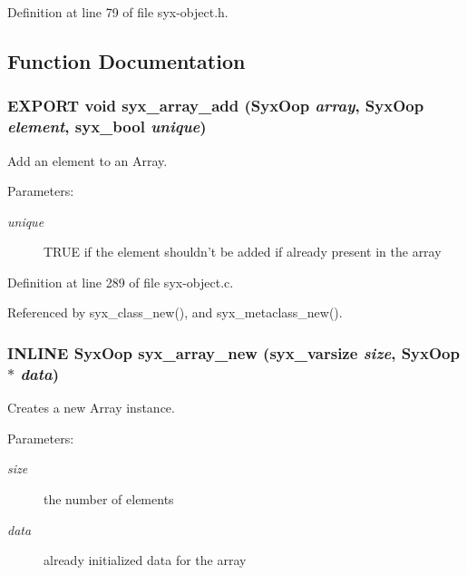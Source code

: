 Definition at line 79 of file syx-object.h.

\subsection{Function Documentation}
\hypertarget{syx-object_8h_b322ffdd7c235f42e9bd992a6013c680}{
\subsubsection{\setlength{\rightskip}{0pt plus 5cm}EXPORT void syx\_\-array\_\-add ({\bf SyxOop} {\em array}, \/  {\bf SyxOop} {\em element}, \/  {\bf syx\_\-bool} {\em unique})}}
\label{syx-object_8h_b322ffdd7c235f42e9bd992a6013c680}


Add an element to an Array.

\begin{Desc}
\item[Parameters:]
\begin{description}
\item[{\em unique}]TRUE if the element shouldn't be added if already present in the array \end{description}
\end{Desc}


Definition at line 289 of file syx-object.c.

Referenced by syx\_\-class\_\-new(), and syx\_\-metaclass\_\-new().\hypertarget{syx-object_8h_73d606c8733a400233809b9dbdffdfb1}{
\subsubsection{\setlength{\rightskip}{0pt plus 5cm}INLINE {\bf SyxOop} syx\_\-array\_\-new ({\bf syx\_\-varsize} {\em size}, \/  {\bf SyxOop} $\ast$ {\em data})}}
\label{syx-object_8h_73d606c8733a400233809b9dbdffdfb1}


Creates a new Array instance.

\begin{Desc}
\item[Parameters:]
\begin{description}
\item[{\em size}]the number of elements \item[{\em data}]already initialized data for the array \end{description}
\end{Desc}


